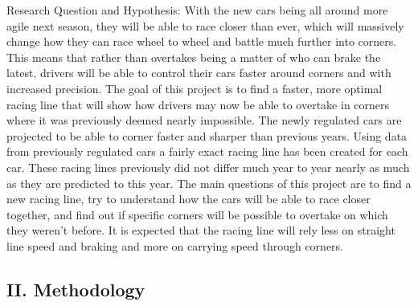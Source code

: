 \documentclass[11pt]{article} %
\begin{document}
Research Question and Hypothesis: With the new cars being all around more agile next season, they will be able to race closer than ever, which will massively change how they can race wheel to wheel and battle much further into corners. This means that rather than overtakes being a matter of who can brake the latest, drivers will be able to control their cars faster around corners and with increased precision. The goal of this project is to find a faster, more optimal racing line that will show how drivers may now be able to overtake in corners where it was previously deemed nearly impossible.
The newly regulated cars are projected to be able to corner faster and sharper than previous years. Using data from previously regulated cars a fairly exact racing line has been created for each car. These racing lines previously did not differ much year to year nearly as much as they are predicted to this year. The main questions of this project are to find a new racing line, try to understand how the cars will be able to race closer together, and find out if specific corners will be possible to overtake on which they weren’t before. It is expected that the racing line will rely less on straight line speed and braking and more on carrying speed through corners.


\subsection{II. Methodology}
\end{document}
